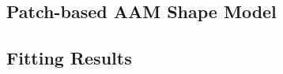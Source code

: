 \subsection{Patch-based AAM Shape Model}
\label{sec:paam_sm}


\subsection{Fitting Results}
\label{sec:paam_fittingresults}

















